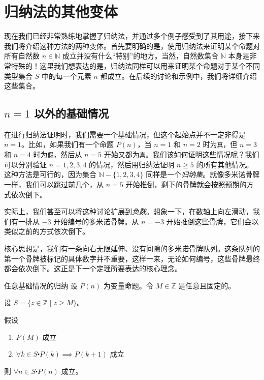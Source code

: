 \section{归纳法的其他变体}

现在我们已经非常熟练地掌握了归纳法，并通过多个例子感受到了其用途，接下来我们将介绍这种方法的两种变体。首先要明确的是，使用归纳法来证明某个命题对所有自然数 $n \in \mathbb{N}$ 成立并没有什么``特别''的地方。当然，自然数集合 $\mathbb{N}$ 本身是非常特殊的！这里我们想表达的是，归纳法同样可以用来证明某个命题对于某个不同类型集合 $S$ 中的每一个元素 $n$ 都成立。在后续的讨论和示例中，我们将详细介绍这些集合。

\subsection{$n = 1$ 以外的基础情况}\label{sec:section5.3.1}

在进行归纳法证明时，我们需要一个基础情况，但这个起始点并不一定非得是 $n = 1$。比如，如果我们有一个命题 $P(n)$，当 $n = 1$ 和 $n = 2$ 时为\verb|真|，但 $n = 3$ 和 $n = 4$ 时为\verb|假|，然后从 $n = 5$ 开始又都为\verb|真|。我们该如何证明这些情况呢？我们可以分别验证 $n = 1,2,3,4$ 的情况，然后用归纳法证明 $n \ge 5$ 的所有其他情况。这种方法是可行的，因为集合 $\mathbb{N} - \{1, 2, 3, 4\}$ 同样是一个\emph{归纳集}。就像多米诺骨牌一样，我们可以跳过前几个，从 $n = 5$ 开始推倒，剩下的骨牌就会按照预期的方式依次倒下。

实际上，我们甚至可以将这种讨论扩展到\emph{负数}。想象一下，在数轴上向左滑动，我们有一排从 $-3$ 开始编号的多米诺骨牌。从 $n = -3$ 开始推倒这些骨牌，它们会以类似之前的方式依次倒下。

核心思想是，我们有一条向右无限延伸、没有间隙的多米诺骨牌队列。这条队列的第一个骨牌被标记的具体数字并不重要，这样一来，无论如何编号，这些骨牌最终都会依次倒下。这正是下一个定理所要表达的核心理念。

\begin{theorem}{任意基础情况的归纳}\label{theorem5.3.1}
    设 $P(n)$ 为变量命题。令 $M \in \mathbb{Z}$ 是任意且固定的。

    设 $S = \{z \in \mathbb{Z} \mid z \ge M\}$。

    假设
    \begin{enumerate}[label=(\arabic*)]
        \item $P(M)$ 成立
        \item $\forall k \in S \centerdot P(k) \implies P(k + 1)$ 成立
    \end{enumerate}

    则 $\forall n \in S \centerdot P(n)$ 成立。
\end{theorem}

